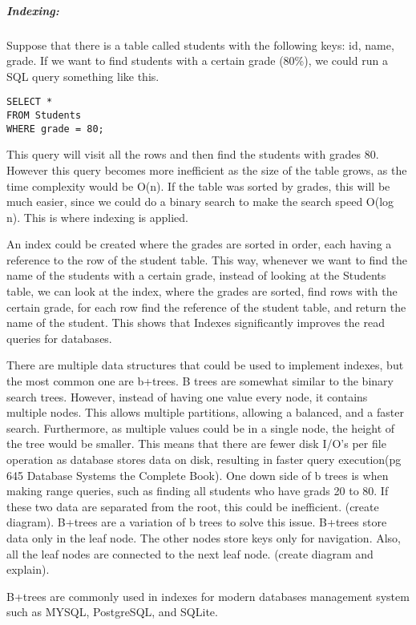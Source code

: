 \subparagraph{Indexing:}
Suppose that there is a table called students with the following keys: id, name, grade. If we want to find students with a certain grade (80\%), we could run a SQL query something like this.
\begin{verbatim}
SELECT * 
FROM Students
WHERE grade = 80;
\end{verbatim}
This query will visit all the rows and then find the students with grades 80. However this query becomes more inefficient as the size of the table grows, as the time complexity would be O(n). If the table was sorted by grades, this will be much easier, since we could do a binary search to make the search speed O(log n). This is where indexing is applied. 

An index could be created where the grades are sorted in order, each having a reference to the row of the student table. This way, whenever we want to find the name of the students with a certain grade, instead of looking at the Students table, we can look at the index, where the grades are sorted, find rows with the certain grade, for each row find the reference of the student table, and return the name of the student. This shows that Indexes significantly improves the read queries for databases. 

There are multiple data structures that could be used to implement indexes, but the most common one are b+trees. B trees are somewhat similar to the binary search trees. However, instead of having one value every node, it contains multiple nodes. This allows multiple partitions, allowing a balanced, and a faster search. Furthermore, as multiple values could be in a single node, the height of the tree would be smaller. This means that there are fewer disk I/O’s per file operation as database stores data on disk, resulting in faster query execution(pg 645 Database Systems the Complete Book). One down side of b trees is when making range queries, such as finding all students who have grads 20 to 80. If these two data are separated from the root, this could be inefficient. (create diagram). B+trees are a variation of b trees to solve this issue. B+trees store data only in the leaf node. The other nodes store keys only for navigation. Also, all the leaf nodes are connected to the next leaf node. (create diagram and explain). 

B+trees are commonly used in indexes for modern databases management system such as MYSQL, PostgreSQL, and SQLite. 

